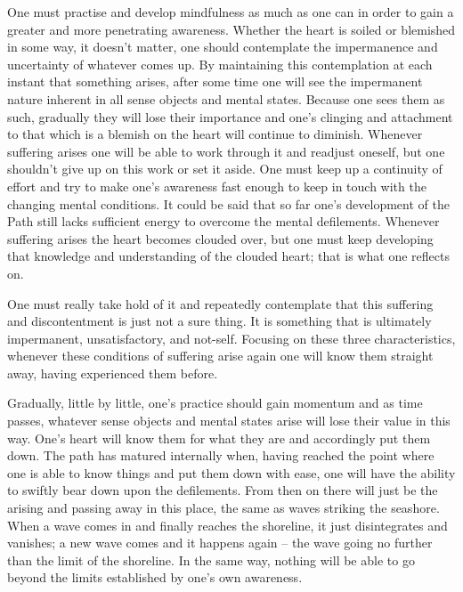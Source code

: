 One must practise and develop mindfulness as much as one can in order to gain a greater and more penetrating awareness. Whether the heart is soiled or blemished in some way, it doesn't matter, one should contemplate the impermanence and uncertainty of whatever comes up. By maintaining this contemplation at each instant that something arises, after some time one will see the impermanent nature inherent in all sense objects and mental states. Because one sees them as such, gradually they will lose their importance and one's clinging and attachment to that which is a blemish on the heart will continue to diminish. Whenever suffering arises one will be able to work through it and readjust oneself, but one shouldn't give up on this work or set it aside. One must keep up a continuity of effort and try to make one's awareness fast enough to keep in touch with the changing mental conditions. It could be said that so far one's development of the Path still lacks sufficient energy to overcome the mental defilements. Whenever suffering arises the heart becomes clouded over, but one must keep developing that knowledge and understanding of the clouded heart; that is what one reflects on.

One must really take hold of it and repeatedly contemplate that this suffering and discontentment is just not a sure thing. It is something that is ultimately impermanent, unsatisfactory, and not-self. Focusing on these three characteristics, whenever these conditions of suffering arise again one will know them straight away, having experienced them before.

Gradually, little by little, one's practice should gain momentum and as time passes, whatever sense objects and mental states arise will lose their value in this way. One's heart will know them for what they are and accordingly put them down. The path has matured internally when, having reached the point where one is able to know things and put them down with ease, one will have the ability to swiftly bear down upon the defilements. From then on there will just be the arising and passing away in this place, the same as waves striking the seashore. When a wave comes in and finally reaches the shoreline, it just disintegrates and vanishes; a new wave comes and it happens again -- the wave going no further than the limit of the shoreline. In the same way, nothing will be able to go beyond the limits established by one's own awareness.

